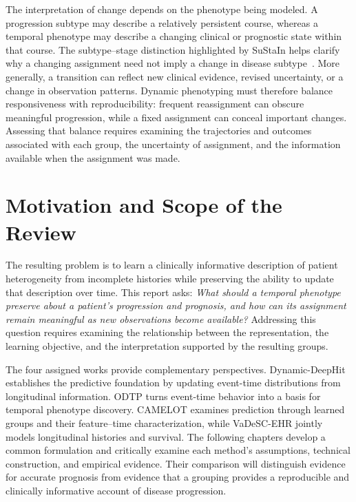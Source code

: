 The interpretation of change depends on the phenotype being modeled. A progression subtype may describe a relatively persistent course, whereas a temporal phenotype may describe a changing clinical or prognostic state within that course. The subtype--stage distinction highlighted by SuStaIn helps clarify why a changing assignment need not imply a change in disease subtype~\cite{young2018sustain}. More generally, a transition can reflect new clinical evidence, revised uncertainty, or a change in observation patterns. Dynamic phenotyping must therefore balance responsiveness with reproducibility: frequent reassignment can obscure meaningful progression, while a fixed assignment can conceal important changes. Assessing that balance requires examining the trajectories and outcomes associated with each group, the uncertainty of assignment, and the information available when the assignment was made.

\section{Motivation and Scope of the Review}

The resulting problem is to learn a clinically informative description of patient heterogeneity from incomplete histories while preserving the ability to update that description over time. This report asks: \emph{What should a temporal phenotype preserve about a patient's progression and prognosis, and how can its assignment remain meaningful as new observations become available?} Addressing this question requires examining the relationship between the representation, the learning objective, and the interpretation supported by the resulting groups.

The four assigned works provide complementary perspectives. Dynamic-DeepHit establishes the predictive foundation by updating event-time distributions from longitudinal information. ODTP turns event-time behavior into a basis for temporal phenotype discovery. CAMELOT examines prediction through learned groups and their feature--time characterization, while VaDeSC-EHR jointly models longitudinal histories and survival. The following chapters develop a common formulation and critically examine each method's assumptions, technical construction, and empirical evidence. Their comparison will distinguish evidence for accurate prognosis from evidence that a grouping provides a reproducible and clinically informative account of disease progression.
